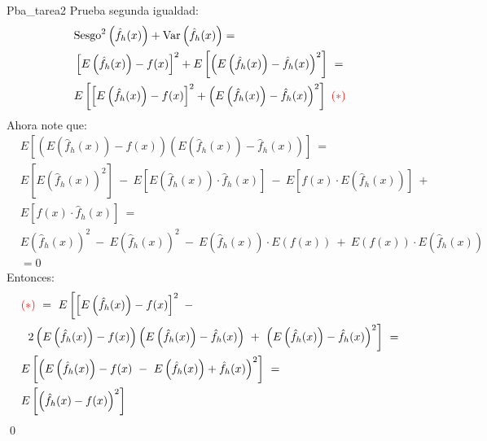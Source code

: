 \documentclass[12pt]{book}\usepackage[]{graphicx}\usepackage[]{color}
\theoremstyle{definition}
\theoremstyle{plain}
\begin{document}
\begin{solucion}{}{Pba_tarea2}
	Prueba segunda igualdad:
	\begin{align*}
		& \text{Sesgo}^2\left(\hat{f}_h(x)  \right) + \text{Var}\left( \hat{f}_h(x)\right)  = \\ & \left[ E\left(\hat{f}_h(x)\right) - f(x)\right]^2 + E\left[\left( E\left(\hat{f}_h(x)\right) - \hat{f}_h(x)\right)^2\right] \ =
		\\ & E\left[\left[ E\left(\hat{f}_h(x)\right) - f(x)\right]^2 + \left( E\left(\hat{f}_h(x)\right) - \hat{f}_h(x)\right)^2   \right] \ \textcolor{red}{(*)} \
	\end{align*}
	Ahora note que:
	\begin{align*}
		  & E\left[\left( E\left(\hat{f}_h(x)\right) - f(x)   \right) \left(E\left(\hat{f}_h(x)\right) - \hat{f}_h(x)    \right)    \right] \ = \                                      \\
		  & E\left[E\left(\hat{f}_h(x)\right)^2 \right] \ - \ E\left[E\left(\hat{f}_h(x)\right)\cdot \hat{f}_h(x) \right] \ - \ E\left[f(x)\cdot E\left(\hat{f}_h(x)\right)\right] \ + \\
		  & E\left[f(x)\cdot \hat{f}_h(x)\right]\ = \                                                                                                                                  \\
		  & E\left(\hat{f}_h(x)\right)^2  \ - \ E\left(\hat{f}_h(x)\right)^2  \ - \ E\left(\hat{f}_h(x)\right)\cdot E\left( f(x)\right) \ + \
		E\left( f(x)\right)\cdot E\left(\hat{f}_h(x)\right) \                                                                                                                         \\
		  & = 0
	\end{align*}
	Entonces:
	\begin{align*}
		  & \textcolor{red}{(*)} \ = \ E\left[\left[ E\left(\hat{f}_h(x)\right) - f(x)\right]^2 \ -  \right.                                                                                                         \\
		  & \left. \ 2\left( E\left(\hat{f}_h(x)\right) - f(x)   \right) \left(E\left(\hat{f}_h(x)\right) - \hat{f}_h(x)    \right) \ + \ \left( E\left(\hat{f}_h(x)\right) - \hat{f}_h(x)\right)^2   \right] \ = \  \\
		  & E\left[ \left(E\left(\hat{f}_h(x)\right) - f(x) \ - \ E\left(\hat{f}_h(x)\right) + \hat{f}_h(x) \right)^2   \right] \ = \                                                                                \\
		  & E\left[\left(\hat{f}_h(x) - f(x)\right)^2    \right]
	\end{align*}
	\qed
\end{solucion}
\end{document}
